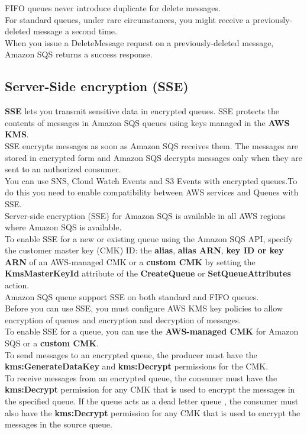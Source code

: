 \documentclass[12pt, letterpaper, twoside]{article}
\begin{document}
FIFO queues never introduce duplicate for delete messages.\\
For standard queues, under rare circumstances, you might receive a previously-deleted message a second time.\\

When you issue a DeleteMessage request on a previously-deleted message, Amazon SQS returns a success response.\\

\subsection{Server-Side encryption (SSE)}
\textbf{SSE} lets you transmit sensitive data in encrypted queues. SSE protects the contents of messages in Amazon SQS 
queues using keys managed in the \textbf{AWS KMS}.\\
SSE encrypts messages as soon as Amazon SQS receives them. The messages are stored in encrypted form and Amazon SQS 
decrypts messages only when they are sent to an authorized consumer.\\

You can use SNS, Cloud Watch Events and S3 Events with encrypted queues.To do this you need to enable compatibility between 
AWS services and Queues with SSE.\\

Server-side encryption (SSE) for Amazon SQS is available in all AWS regions where Amazon SQS is available.\\

To enable SSE for a new or existing queue using the Amazon SQS API, specify the customer master key (CMK) ID: 
the \textbf{alias}, \textbf{alias ARN}, \textbf{key ID or key ARN} of an AWS-managed CMK or a \textbf{custom CMK} by setting 
the \textbf{KmsMasterKeyId} attribute of the \textbf{CreateQueue} or \textbf{SetQueueAttributes} action.\\

Amazon SQS queue support SSE on both standard and FIFO queues.\\

Before you can use SSE, you must configure AWS KMS key policies to allow encryption of queues and encryption and 
decryption of messages.\\
To enable SSE for a queue, you can use the \textbf{AWS-managed CMK} for Amazon SQS or a \textbf{custom CMK}.\\
To send messages to an encrypted queue, the producer must have the \textbf{kms:GenerateDataKey} and 
\textbf{kms:Decrypt} permissions for the CMK.\\
To receive messages from an encrypted queue, the consumer must have the \textbf{kms:Decrypt} permission for any 
CMK that is used to encrypt the messages in the specified queue. If the queue acts as a dead letter queue , 
the consumer must also have the \textbf{kms:Decrypt} permission for any CMK that is used to encrypt the messages 
in the source queue.\\
\end{document}
